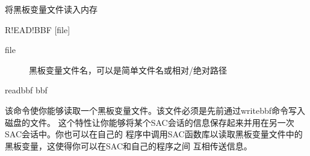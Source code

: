 \label{cmd:readbbf}

将黑板变量文件读入内存

\begin{SACSTX}
R!EAD!BBF [file]
\end{SACSTX}

\begin{description}
\item [file] 黑板变量文件名，可以是简单文件名或相对/绝对路径
\end{description}

\begin{SACDFT}
readbbf bbf
\end{SACDFT}

该命令使你能够读取一个黑板变量文件。该文件必须是先前通过writebbf命令写入磁盘的文件。
这个特性让你能够将某个SAC会话的信息保存起来并用在另一次SAC会话中。你也可以在自己的
程序中调用SAC函数库以读取黑板变量文件中的黑板变量，这使得你可以在SAC和自己的程序之间
互相传送信息。
